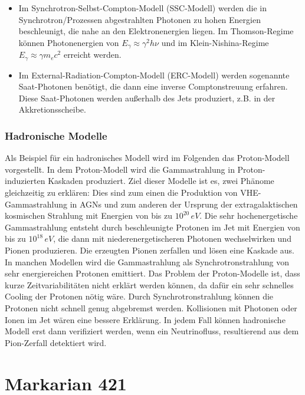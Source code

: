 \begin{itemize}
\item Im Synchrotron-Selbst-Compton-Modell (SSC-Modell) werden die in Synchrotron\-/Prozessen abgestrahlten Photonen zu hohen Energien beschleunigt, die nahe an den Elektronenergien liegen.
Im Thomson-Regime können Photonenergien von $E_{\gamma}\approx \gamma^2 h \nu$ und im Klein-Nishina-Regime $E_{\gamma}\approx \gamma m_e c^2$ erreicht werden.\cite{Weekes}
\item Im External-Radiation-Compton-Modell (ERC-Modell) werden sogenannte Saat-Photonen benötigt, die dann eine inverse Comptonstreuung erfahren.
Diese Saat-Photonen werden außerhalb des Jets produziert, z.B. in der Akkretionsscheibe.\cite{Weekes}
\end{itemize}

\subsubsection{Hadronische Modelle}
Als Beispiel für ein hadronisches Modell wird im Folgenden das Proton-Modell vorgestellt.
In dem Proton-Modell wird die Gammastrahlung in Proton-induzierten Kaskaden produziert. 
Ziel dieser Modelle ist es, zwei Phänome gleichzeitig zu erklären: 
Dies sind zum einen die Produktion von VHE-Gammastrahlung in AGNs und zum anderen der Ursprung der extragalaktischen kosmischen Strahlung mit Energien von bis zu $10^{20}\,\si{eV}$.
Die sehr hochenergetische Gammastrahlung entsteht durch beschleunigte Protonen im Jet mit Energien von bis zu $10^{18}\,\si{eV}$, die dann mit niederenergetischeren Photonen wechselwirken und Pionen produzieren.
Die erzeugten Pionen zerfallen und lösen eine Kaskade aus.
In manchen Modellen wird die Gammastrahlung als Synchrotronstrahlung von sehr energiereichen Protonen emittiert.
Das Problem der Proton-Modelle ist, dass kurze Zeitvariabilitäten nicht erklärt werden können, da dafür ein sehr schnelles Cooling der Protonen nötig wäre. 
Durch Synchrotronstrahlung können die Protonen nicht schnell genug abgebremst werden.
Kollisionen mit Photonen oder Ionen im Jet wären eine bessere Erklärung.
In jedem Fall können hadronische Modell erst dann verifiziert werden, wenn ein Neutrinofluss, resultierend aus dem Pion-Zerfall detektiert wird.\cite{Weekes}


\section{Markarian 421}
\label{sec:Mrk421}

